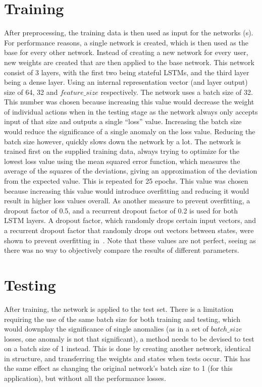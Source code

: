 \section{Training}
After preprocessing, the training data is then used as input for the networks (s). For performance reasons, a single network is created, which is then used as the base for every other network. Instead of creating a new network for every user, new weights are created that are then applied to the base network. This network consist of 3 layers, with the first two being stateful LSTMs, and the third layer being a dense layer. Using an internal representation vector (and layer output) size of 64, 32 and \(feature\_size\) respectively. The network uses a batch size of 32. This number was chosen because increasing this value would decrease the weight of individual actions when in the testing stage as the network always only accepts input of that size and outputs a single \enquote{loss} value. Increasing the batch size would reduce the significance of a single anomaly on the loss value. Reducing the batch size however, quickly slows down the network by a lot. The network is trained first on the supplied training data, always trying to optimize for the lowest loss value using the mean squared error function, which measures the average of the squares of the deviations, giving an approximation of the deviation from the expected value. This is repeated for 25 epochs. This value was chosen because increasing this value would introduce overfitting and reducing it would result in higher loss values overall. As another measure to prevent overfitting, a dropout factor of 0.5, and a recurrent dropout factor of 0.2 is used for both LSTM layers. A dropout factor, which randomly drops certain input vectors, and a recurrent dropout factor that randomly drops out vectors between states, were shown to prevent overfitting in~\cite{srivastava2014dropout}. Note that these values are not perfect, seeing as there was no way to objectively compare the results of different parameters.

\section{Testing}
After training, the network is applied to the test set. There is a limitation requiring the use of the same batch size for both training and testing, which would downplay the significance of single anomalies (as in a set of \(batch\_size\) losses, one anomaly is not that significant), a method needs to be devised to test on a batch size of 1 instead. This is done by creating another network, identical in structure, and transferring the weights and states when tests occur. This has the same effect as changing the original network's batch size to 1 (for this application), but without all the performance losses.

